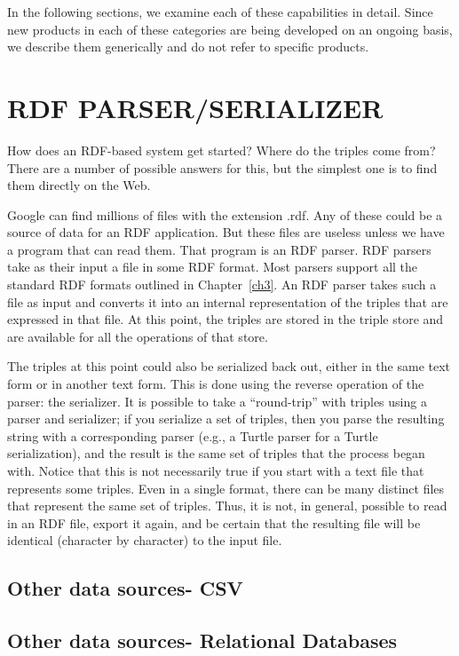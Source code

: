 In the following sections, we examine each of these capabilities in
detail. Since new products in each of these categories are being
developed on an ongoing basis, we describe them generically and do not
refer to specific products.

\section{RDF PARSER/SERIALIZER}

How does an RDF-based system get started? Where do the triples come
from? There are a number of possible answers for this, but the simplest
one is to find them directly on the Web.

Google can find millions of files with the extension .rdf. Any of these
could be a source of data for an RDF application. But these files are
useless unless we have a program that can read them. That program is an
RDF parser. RDF parsers take as their input a file in some RDF format.
Most parsers support all the standard RDF formats outlined in Chapter~\ref{ch3}. 
An RDF parser takes such a file as input and converts it into an
internal representation of the triples that are expressed in that file.
At this point, the triples are stored in the triple store and are
available for all the operations of that store.

The triples at this point could also be serialized back out, either in
the same text form or in another text form. This is done using the
reverse operation of the parser: the serializer. It is possible to take
a ``round-trip'' with triples using a parser and serializer; if you
serialize a set of triples, then you parse the resulting string with a
corresponding parser (e.g., a Turtle parser for a Turtle serialization),
and the result is the same set of triples that the process began with.
Notice that this is not necessarily true if you start with a text file
that represents some triples. Even in a single format, there can be many
distinct files that represent the same set of triples. Thus, it is not,
in general, possible to read in an RDF file,
export it again, and be certain that the resulting file will be
identical (character by character) to the input file.

\subsection{Other data sources- CSV}

\subsection{Other data sources- Relational Databases}

